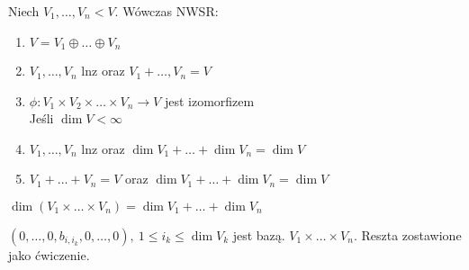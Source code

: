 \begin{ft} 
    Niech $V_1,\ldots,V_n < V$. Wówczas NWSR:
    \begin{enumerate}[(1)]
        \item $V = V_1 \oplus \ldots \oplus V_n$
        \item $V_1,\ldots,V_n$ lnz oraz $V_1+\ldots,V_n=V$
        \item $\phi : V_1 \times V_2 \times \ldots \times V_n \to V$ jest izomorfizem \\
        Jeśli $\dim V < \infty$
        \item $V_1,\ldots,V_n$ lnz oraz $\dim V_1 + \ldots + \dim V_n = \dim V$ 
        \item $V_1+\ldots + V_n = V$ oraz $\dim V_1 + \ldots + \dim V_n = \dim V$
    \end{enumerate}
\end{ft} 
\begin{lem} \label{indeksior}
    $\dim (V_1 \times \ldots \times V_n) = \dim V_1 + \ldots + \dim V_n$
    \begin{dd} 
        $(0,\ldots,0,b_{i,i_k},0,\ldots,0),\ 1 \le i_k \le \dim V_k$
        jest bazą. $V_1 \times \ldots \times V_n$. Reszta zostawione jako ćwiczenie.
    \end{dd} 
\end{lem} 
